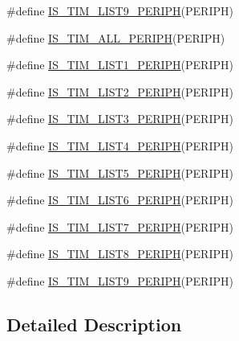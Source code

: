 \begin{DoxyCompactItemize}
\#define \hyperlink{group___t_i_m___exported__constants_ga24ff46311f2d074ec6bd93f2972d1d9b}{I\+S\+\_\+\+T\+I\+M\+\_\+\+L\+I\+S\+T9\+\_\+\+P\+E\+R\+I\+PH}(P\+E\+R\+I\+PH)
\item 
\#define \hyperlink{group___t_i_m___exported__constants_ga71710da28a59c007a1d2ddee18a5ffcc}{I\+S\+\_\+\+T\+I\+M\+\_\+\+A\+L\+L\+\_\+\+P\+E\+R\+I\+PH}(P\+E\+R\+I\+PH)
\item 
\#define \hyperlink{group___t_i_m___exported__constants_ga1abea04e3837b7683d8e8dc33441677f}{I\+S\+\_\+\+T\+I\+M\+\_\+\+L\+I\+S\+T1\+\_\+\+P\+E\+R\+I\+PH}(P\+E\+R\+I\+PH)
\item 
\#define \hyperlink{group___t_i_m___exported__constants_ga3c489ac3294f0d8f2ec097da909bc8e0}{I\+S\+\_\+\+T\+I\+M\+\_\+\+L\+I\+S\+T2\+\_\+\+P\+E\+R\+I\+PH}(P\+E\+R\+I\+PH)
\item 
\#define \hyperlink{group___t_i_m___exported__constants_ga2d80541c542755ac3f2aca078bd98adb}{I\+S\+\_\+\+T\+I\+M\+\_\+\+L\+I\+S\+T3\+\_\+\+P\+E\+R\+I\+PH}(P\+E\+R\+I\+PH)
\item 
\#define \hyperlink{group___t_i_m___exported__constants_ga9c2699fd3d0c0901f8ac706c3d2dfe10}{I\+S\+\_\+\+T\+I\+M\+\_\+\+L\+I\+S\+T4\+\_\+\+P\+E\+R\+I\+PH}(P\+E\+R\+I\+PH)
\item 
\#define \hyperlink{group___t_i_m___exported__constants_ga90232c3966a578fbd9be2b228f225cb4}{I\+S\+\_\+\+T\+I\+M\+\_\+\+L\+I\+S\+T5\+\_\+\+P\+E\+R\+I\+PH}(P\+E\+R\+I\+PH)
\item 
\#define \hyperlink{group___t_i_m___exported__constants_ga99fabffbddc9ca930f80a4480daeecbe}{I\+S\+\_\+\+T\+I\+M\+\_\+\+L\+I\+S\+T6\+\_\+\+P\+E\+R\+I\+PH}(P\+E\+R\+I\+PH)
\item 
\#define \hyperlink{group___t_i_m___exported__constants_ga421bba71d6e8fbe9a9d422ecd59e79be}{I\+S\+\_\+\+T\+I\+M\+\_\+\+L\+I\+S\+T7\+\_\+\+P\+E\+R\+I\+PH}(P\+E\+R\+I\+PH)
\item 
\#define \hyperlink{group___t_i_m___exported__constants_ga120d98895bd48d628028753212b68233}{I\+S\+\_\+\+T\+I\+M\+\_\+\+L\+I\+S\+T8\+\_\+\+P\+E\+R\+I\+PH}(P\+E\+R\+I\+PH)
\item 
\#define \hyperlink{group___t_i_m___exported__constants_ga24ff46311f2d074ec6bd93f2972d1d9b}{I\+S\+\_\+\+T\+I\+M\+\_\+\+L\+I\+S\+T9\+\_\+\+P\+E\+R\+I\+PH}(P\+E\+R\+I\+PH)
\end{DoxyCompactItemize}


\subsection{Detailed Description}


